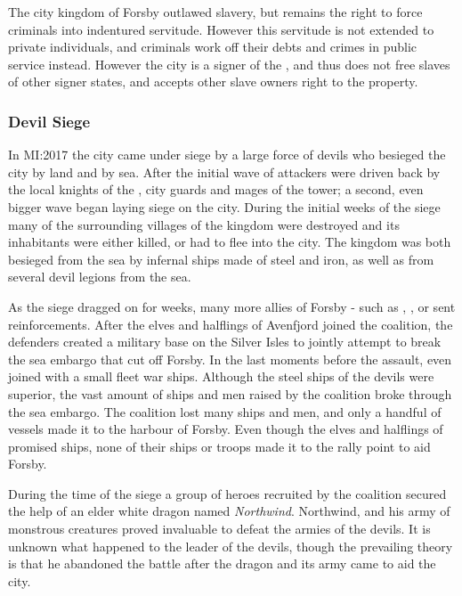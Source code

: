 The city kingdom of Forsby outlawed slavery, but remains the right to force
criminals into indentured servitude. However this servitude is not extended
to private individuals, and criminals work off their debts and crimes in public
service instead. However the city is a signer of the ,
and thus does not free slaves of other signer states, and accepts other slave
owners right to the property.

\subsubsection{Devil Siege}
\label{sec:Devil Siege}


In MI:2017 the city came under siege by a large force of devils who besieged
the city by land and by sea. After the initial wave of attackers were driven
back by the local knights of the , city guards and mages of
the tower; a second, even bigger wave began laying siege on the city. During
the initial weeks of the siege many of the surrounding villages of the kingdom
were destroyed and its inhabitants were either killed, or had to flee into the
city. The kingdom was both besieged from the sea by infernal ships made of
steel and iron, as well as from several devil legions from the sea.

As the siege dragged on for weeks, many more allies of Forsby - such as
, ,  or
 sent reinforcements. After the elves and halflings of
Avenfjord joined the coalition, the defenders created a military base on the
Silver Isles to jointly attempt to break the sea embargo that cut off
Forsby. In the last moments before the assault, even  joined
with a small fleet war ships. Although the steel ships of the devils were
superior, the vast amount of ships and men raised by the coalition broke
through the sea embargo. The coalition lost many ships and men, and only a
handful of vessels made it to the harbour of Forsby. Even though the elves and
halflings of  promised ships, none of their ships or
troops made it to the rally point to aid Forsby.

During the time of the siege a group of heroes recruited by the coalition
secured the help of an elder white dragon named \emph{Northwind}. Northwind,
and his army of monstrous creatures proved invaluable to defeat the armies of
the devils. It is unknown what happened to the leader of the devils, though
the prevailing theory is that he abandoned the battle after the dragon and its
army came to aid the city.


